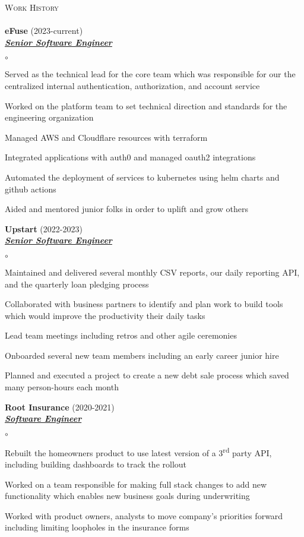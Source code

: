 \documentclass{article}
\newcommand{\lineunder}{\vspace*{-8pt} \\ \hspace*{-18pt} \hrulefill{} \\}
\newcommand{\header}[1]{{\hspace*{-15pt}\vspace*{6pt} \textsc{#1}} \vspace*{-6pt} \lineunder}
\newcommand{\employer}[3]{{ \textbf{#1} (#2)\\ \underline{\textbf{\emph{#3}}}\\  }}
\newenvironment{achievements}{\begin{list}{$\circ$}{\topsep 0pt \itemsep -2pt}}{\vspace*{4pt}\end{list}}
\newcommand{\ts}{\textsuperscript}
\begin{document}
\header{Work History}
\employer{eFuse}{2023-current}{Senior Software Engineer}
	\begin{achievements}
	\item Served as the technical lead for the core team which was responsible for our the centralized internal authentication, authorization, and account service
	\item Worked on the platform team to set technical direction and standards for the engineering organization
	\item Managed AWS and Cloudflare resources with terraform
	\item Integrated applications with auth0 and managed oauth2 integrations
	\item Automated the deployment of services to kubernetes using helm charts and github actions
	\item Aided and mentored junior folks in order to uplift and grow others
	\end{achievements}
\employer{Upstart}{2022-2023}{Senior Software Engineer}
	\begin{achievements}
	\item Maintained and delivered several monthly CSV reports, our daily reporting API, and the quarterly loan pledging process
	\item Collaborated with business partners to identify and plan work to build tools which would improve the productivity their daily tasks
	\item Lead team meetings including retros and other agile ceremonies
	\item Onboarded several new team members including an early career junior hire
	\item Planned and executed a project to create a new debt sale process which saved many person-hours each month
	\end{achievements}
\employer{Root Insurance}{2020-2021}{Software Engineer}
	\begin{achievements}
	\item Rebuilt the homeowners product to use latest version of a 3\ts{rd} party API, including building dashboards to track the rollout
	\item Worked on a team responsible for making full stack changes to add new functionality which enables new business goals during underwriting
	\item Worked with product owners, analysts to move company's priorities forward including limiting loopholes in the insurance forms
	\end{achievements}
\end{document}
